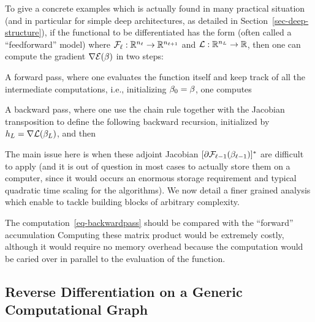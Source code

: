 To give a concrete examples which is actually found in many practical situation (and in particular for simple deep architectures, as detailed in Section~\ref{sec-deep-structure}), if the functional to be differentiated has the form 
(often called a ``feedforward'' model) where $\mathcal{F}_\ell : \mathbb{R}^{n_\ell} \rightarrow \mathbb{R}^{n_{\ell+1}}$ and $\mathcal{L} : \mathbb{R}^{n_L} \rightarrow \mathbb{R}$, then one can compute the gradient $\nabla \mathcal{E}(\beta)$ in two steps:
\begin{rs} 
	\item A forward pass, where one evaluates the function itself and keep track of all the intermediate computations, i.e., initializing $\beta_0=\beta$, one computes
	\item A backward pass, where one use the chain rule together with the Jacobian transposition
		to define the following backward recursion, initialized by $h_L = \nabla \mathcal{L}(\beta_L)$, and then
\end{rs}
The main issue here is when these adjoint Jacobian $[\partial \mathcal{F}_{\ell-1}(\beta_{\ell-1})]^*$ are difficult to apply (and it is out of question in most cases to actually store them on a computer, since it would occurs an enormous storage requirement and typical quadratic time scaling for the algorithms). We now detail a finer grained analysis which enable to tackle building blocks of arbitrary complexity.

The computation~\eqref{eq-backwardpass} should be compared with the ``forward'' accumulation
Computing these matrix product would be extremely costly, although it would require no memory overhead because the computation would be caried over in parallel to the evaluation of the function.

\subsection{Reverse Differentiation on a Generic Computational Graph}
\label{sec-reverse-mode}

